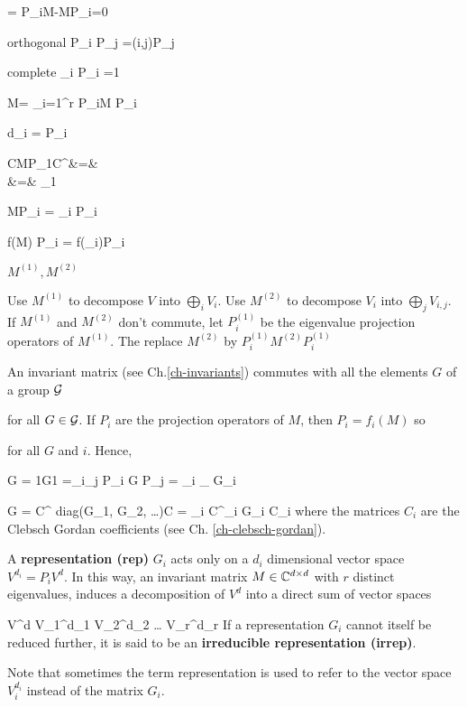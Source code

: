 \beq
[P_i, M]=
P_iM-MP_i=0
\eeq

orthogonal
\beq
P_i P_j =\delta(i,j)P_j
\eeq

complete
\beq
\sum_i P_i =1
\eeq

\beq
M= \sum_{i=1}^r
P_iM P_i
\eeq

\beq
d_i = \tr P_i
\eeq

\beqa
CMP_1C^\dagger &=&
\left[
\begin{array}{cc}
1&0
\\
0&0
\end{array}
\right] 
\\
&=&
\lam_1
\left[
\begin{array}{cc}
1&0
\\
0&0
\end{array}
\right] 
\eeqa

\beq
MP_i = \lam_i P_i \;
\eeq

\beq
f(M) P_i = f(\lam_i)P_i \;
\eeq

$M^{(1)}, M^{(2)}$

\eeq
Use $M^{(1)}$ to decompose $V$
into $\bigoplus_i V_i$.
Use  $M^{(2)}$ to decompose $V_i$ into
$\bigoplus_j V_{i,j}$. 
If $M^{(1)}$ and $M^{(2)}$ don't
commute, let $P^{(1)}_i$ be the eigenvalue 
projection operators of $M^{(1)}$. The replace $M^{(2)}$ by $P^{(1)}_i M^{(2)}P_i^{(1)}$

\eeq

An invariant matrix (see Ch.\ref{ch-invariants}) commutes with 
all the elements $G$ of a group ${\cal G}$

\eeq
for all $G\in{\cal G}$.
If $P_i$ are 
the projection operators of $M$, then $P_i=f_i(M)$ so

\eeq
for all $G$ and $i$.
Hence,

\beq
G = 1G1 =\sum_i\sum_j P_i G P_j
=
\sum_i _
{\eqdef G_i}
\eeq

\beq
G = C^\dagger 
diag(G_1, G_2, \ldots)C
=
\sum_i
C^\dagger_i
G_i C_i
\eeq
where the matrices $C_i$
are the Clebsch Gordan 
coefficients (see Ch. \ref{ch-clebsch-gordan}).

A {\bf representation (rep)} $G_i$ acts only
on a $d_i$ dimensional vector space $V^{d_i}=P_i V^d$.
In this way, an invariant
matrix $M\in { \mathbb{C}}^{d\times d}$
with $r$ 
distinct eigenvalues,
induces a decomposition of $V^d$
into a direct sum of vector spaces

\beq
V^d
V_1^{d_1}
\oplus 
V_2^{d_2}
\oplus
\ldots
\oplus 
V_r^{d_r}
\eeq
If a representation $G_i$ cannot itself be
reduced further, it is said to 
be an {\bf irreducible representation (irrep)}.

Note that sometimes the term representation
is used to refer to the 
vector space $V_i^{d_i}$
instead of the matrix $G_i$.